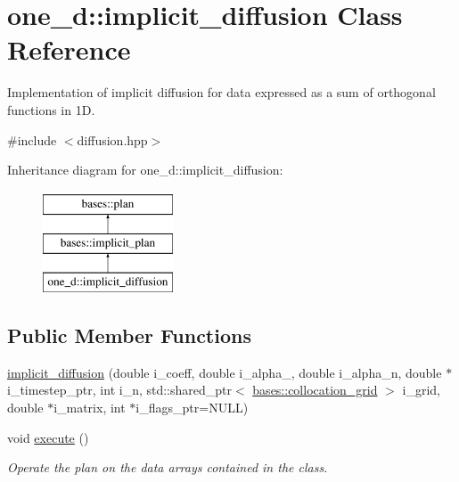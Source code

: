 \hypertarget{classone__d_1_1implicit__diffusion}{\section{one\-\_\-d\-:\-:implicit\-\_\-diffusion Class Reference}
\label{classone__d_1_1implicit__diffusion}
}


Implementation of implicit diffusion for data expressed as a sum of orthogonal functions in 1\-D.  




{\ttfamily \#include $<$diffusion.\-hpp$>$}

Inheritance diagram for one\-\_\-d\-:\-:implicit\-\_\-diffusion\-:\begin{figure}[H]
\begin{center}
\leavevmode
\includegraphics[height=3.000000cm]{classone__d_1_1implicit__diffusion}
\end{center}
\end{figure}
\subsection*{Public Member Functions}
\begin{DoxyCompactItemize}
\item 
\hyperlink{classone__d_1_1implicit__diffusion_af37d08e6f8cf358d294f517a19c07f4d}{implicit\-\_\-diffusion} (double i\-\_\-coeff, double i\-\_\-alpha\-\_, double i\-\_\-alpha\-\_\-n, double $\ast$i\-\_\-timestep\-\_\-ptr, int i\-\_\-n, std\-::shared\-\_\-ptr$<$ \hyperlink{classbases_1_1collocation__grid}{bases\-::collocation\-\_\-grid} $>$ i\-\_\-grid, double $\ast$i\-\_\-matrix, int $\ast$i\-\_\-flags\-\_\-ptr=N\-U\-L\-L)
\item 
void \hyperlink{classone__d_1_1implicit__diffusion_a6ccaf3ea76d05f3373e934862904ab5a}{execute} ()
\begin{DoxyCompactList}\small\item\em Operate the plan on the data arrays contained in the class. \end{DoxyCompactList}\end{DoxyCompactItemize}
